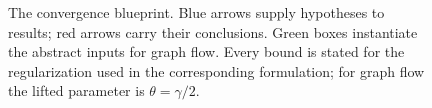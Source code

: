 \begin{figure}[htbp]
\centering
\resizebox{\linewidth}{!}{}
\caption{The convergence blueprint. Blue arrows supply hypotheses to results; red arrows carry their conclusions. Green boxes instantiate the abstract inputs for graph flow. Every bound is stated for the regularization used in the corresponding formulation; for graph flow the lifted parameter is $\theta=\gamma/2$.}
\label{fig:blueprint}
\end{figure}
